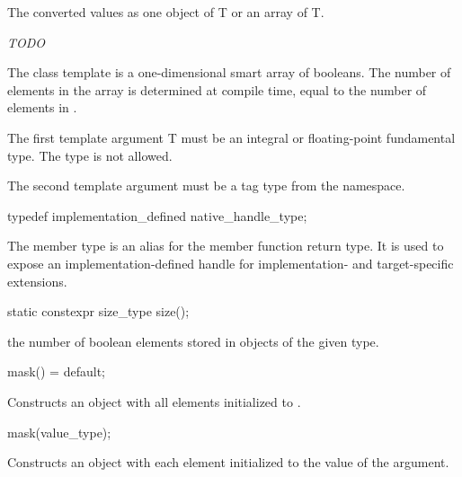 \begin{wgText}
\begin{itemdescr}
    \pnum\returns The converted values as one object of \type T or an array of \type T.
  \end{itemdescr}

  \textit{TODO}

  

  \pnum The class template \mask[<T, Abi>] is a one-dimensional smart array of booleans.
  The number of elements in the array is determined at compile time, equal to the number of elements in \datapar[<T, Abi>].

  \pnum The first template argument \type T must be an integral or floating-point fundamental type.
  The type \bool is not allowed.

  \pnum The second template argument  must be a tag type from the  namespace.

  \begin{itemdecl}
typedef implementation_defined native_handle_type;
  \end{itemdecl}
  \begin{itemdescr}
    \pnum The  member type is an alias for the  member function return type.
    It is used to expose an implementation-defined handle for implementation- and target-specific extensions.
  \end{itemdescr}

  \begin{itemdecl}
static constexpr size_type size();
  \end{itemdecl}
  \begin{itemdescr}
    \pnum\returns the number of boolean elements stored in objects of the given \mask[<T, Abi>] type.
  \end{itemdescr}

  \begin{itemdecl}
mask() = default;
  \end{itemdecl}
  \begin{itemdescr}
    \pnum\effects Constructs an object with all elements initialized to .
  \end{itemdescr}

  \begin{itemdecl}
mask(value_type);
  \end{itemdecl}
  \begin{itemdescr}
    \pnum\effects Constructs an object with each element initialized to the value of the argument.
  \end{itemdescr}


\end{wgText}
